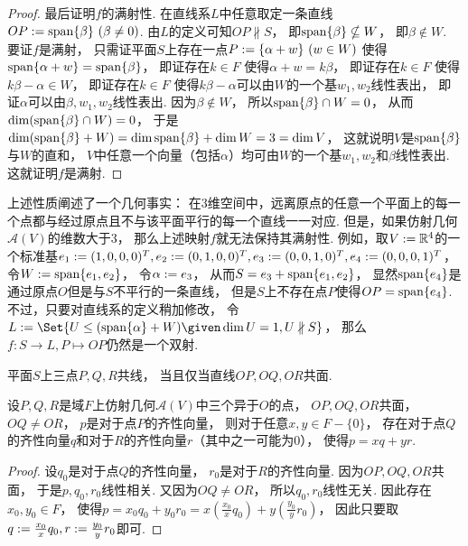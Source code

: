 \begin{property}
\begin{proof}
最后证明\(f\)的满射性.
在直线系\(L\)中任意取定一条直线\(OP := \operatorname{span}\{\beta\}\ (\beta\neq0)\).
由\(L\)的定义可知\(OP \nparallel S\)，
即\(\operatorname{span}\{\beta\} \nsubseteq W\)，
即\(\beta \notin W\).
要证\(f\)是满射，
只需证平面\(S\)上存在一点\(P := \{\alpha + w\}\ (w \in W)\)
使得\(\operatorname{span}\{\alpha + w\} = \operatorname{span}\{\beta\}\)，
即证存在\(k \in F\)
使得\(\alpha + w = k \beta\)，
即证存在\(k \in F\)
使得\(k \beta - \alpha \in W\)，
即证存在\(k \in F\)
使得\(k \beta - \alpha\)可以由\(W\)的一个基\(w_1,w_2\)线性表出，
即证\(\alpha\)可以由\(\beta,w_1,w_2\)线性表出.
因为\(\beta \notin W\)，
所以\(\operatorname{span}\{\beta\} \cap W = 0\)，
从而\(
	\dim(\operatorname{span}\{\beta\} \cap W) = 0
\)，
于是\(
	\dim(\operatorname{span}\{\beta\} + W)
	= \dim\operatorname{span}\{\beta\}
	+ \dim W
	= 3
	= \dim V
\)，
这就说明\(V\)是\(\operatorname{span}\{\beta\}\)与\(W\)的直和，
\(V\)中任意一个向量（包括\(\alpha\)）均可由\(W\)的一个基\(w_1,w_2\)和\(\beta\)线性表出.
这就证明\(f\)是满射.
\end{proof}
\end{property}
\begin{remark}
上述性质阐述了一个几何事实：
在3维空间中，远离原点的任意一个平面上的每一个点都与经过原点且不与该平面平行的每一个直线一一对应.
但是，如果仿射几何\(\mathcal{A}(V)\)的维数大于\(3\)，
那么上述映射\(f\)就无法保持其满射性.
例如，取\(V := \mathbb{R}^4\)的一个标准基\(
	e_1 := (1,0,0,0)^T,
	e_2 := (0,1,0,0)^T,
	e_3 := (0,0,1,0)^T,
	e_4 := (0,0,0,1)^T
\)，
令\(W := \operatorname{span}\{e_1,e_2\}\)，
令\(\alpha := e_3\)，
从而\(S = e_3 + \operatorname{span}\{e_1,e_2\}\)，
显然\(\operatorname{span}\{e_4\}\)是通过原点\(O\)但是与\(S\)不平行的一条直线，
但是\(S\)上不存在点\(P\)使得\(OP = \operatorname{span}\{e_4\}\).
不过，只要对直线系的定义稍加修改，
令\(  %
	L
	\defeq
	\Set{
		U \AlgebraSubstructure (\Span\{\alpha\} + W)
		\given
		\dim U = 1,
		U \nparallel S
	}
\)，
那么\(f\colon S \to L, P \mapsto OP\)仍然是一个双射.
\end{remark}

\begin{property}
平面\(S\)上三点\(P,Q,R\)共线，
当且仅当直线\(OP,OQ,OR\)共面.
\end{property}

\begin{lemma}
设\(P,Q,R\)是域\(F\)上仿射几何\(\mathcal{A}(V)\)中三个异于\(O\)的点，
\(OP,OQ,OR\)共面，
\(OQ \neq OR\)，
\(p\)是对于点\(P\)的齐性向量，
则对于任意\(x,y \in F - \{0\}\)，
存在对于点\(Q\)的齐性向量\(q\)和对于\(R\)的齐性向量\(r\)（其中之一可能为\(0\)），
使得\(p = x q + y r\).
\begin{proof}
设\(q_0\)是对于点\(Q\)的齐性向量，
\(r_0\)是对于\(R\)的齐性向量.
因为\(OP,OQ,OR\)共面，
于是\(p,q_0,r_0\)线性相关.
又因为\(OQ \neq OR\)，
所以\(q_0,r_0\)线性无关.
因此存在\(x_0,y_0 \in F\)，
使得\(
	p = x_0 q_0 + y_0 r_0
	= x \left( \frac{x_0}{x} q_0 \right)
	+ y \left( \frac{y_0}{y} r_0 \right)
\)，
因此只要取\(
	q := \frac{x_0}{x} q_0,
	r := \frac{y_0}{y} r_0
\)即可.
\end{proof}
\end{lemma}

